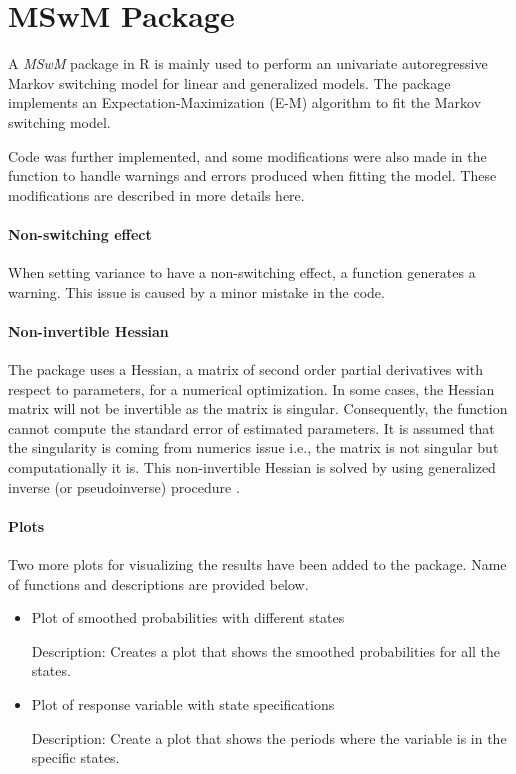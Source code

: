 \section{MSwM Package\label{sec:MSwM-Package}}

A \emph{MSwM} package in R \citep{mswm} is mainly used to perform
an univariate autoregressive Markov switching model for linear and
generalized models. The package implements an Expectation-Maximization
(E-M) algorithm to fit the Markov switching model. 

Code was further implemented, and some modifications were also made
in the function to handle warnings and errors produced when fitting
the model. These modifications are described in more details here.

\paragraph*{Non-switching effect}

When setting variance to have a non-switching effect, a function generates
a warning. This issue is caused by a minor mistake in the code. 

\paragraph{Non-invertible Hessian}

The package uses a Hessian, a matrix of second order partial derivatives
with respect to parameters, for a numerical optimization. In some
cases, the Hessian matrix will not be invertible as the matrix is
singular. Consequently, the function cannot compute the standard error
of estimated parameters. It is assumed that the singularity is coming
from numerics issue i.e., the matrix is not singular but computationally
it is. This non-invertible Hessian is solved by using generalized
inverse (or pseudoinverse) procedure \citep{gill2004your}. 

\paragraph*{Plots}

Two more plots for visualizing the results have been added to the
package. Name of functions and descriptions are provided below. 
\begin{itemize}
\item {} 

Plot of smoothed probabilities with different states

Description: Creates a plot that shows the smoothed probabilities
for all the states.
\item {} 

Plot of response variable with state specifications

Description: Create a plot that shows the periods where the variable
is in the specific states.
\end{itemize}

